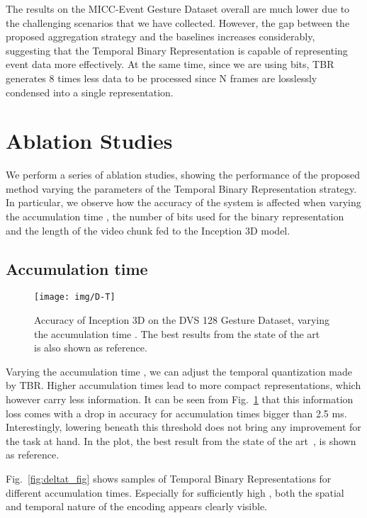 \documentclass[a4paper,conference]{IEEEtran}
\begin{document}
The results on the MICC-Event Gesture Dataset overall are much lower due to the challenging scenarios that we have collected. However, the gap between the proposed aggregation strategy and the baselines increases considerably, suggesting that the Temporal Binary Representation is capable of representing event data more effectively. At the same time, since we are using  bits, TBR generates 8 times less data to be processed since N frames are losslessly condensed into a single representation.

\section{Ablation Studies}
\label{sec:ablation}
We perform a series of ablation studies, showing the performance of the proposed method varying the parameters of the Temporal Binary Representation strategy.
In particular, we observe how the accuracy of the system is affected when varying the accumulation time , the number of bits used for the binary representation and the length of the video chunk fed to the Inception 3D model.

\subsection{Accumulation time}
\begin{figure}[!t]
	\centering
	\texttt{[image: img/D-T]}
	\caption{Accuracy of Inception 3D on the DVS 128 Gesture Dataset, varying the accumulation time . The best results from the state of the art~\cite{ghosh2019spatiotemporal} is also shown as reference.}
	\label{fig:deltat}
\end{figure}

Varying the accumulation time , we can adjust the temporal quantization made by TBR. Higher accumulation times lead to more compact representations, which however carry less information. It can be seen from Fig.~\ref{fig:deltat} that this information loss comes with a drop in accuracy for accumulation times bigger than 2.5 ms. Interestingly, lowering  beneath this threshold does not bring any improvement for the task at hand. In the plot, the best result from the state of the art~\cite{ghosh2019spatiotemporal}, is shown as reference.

Fig.~\ref{fig:deltat_fig} shows samples of Temporal Binary Representations for different accumulation times. Especially for sufficiently high , both the spatial and temporal nature of the encoding appears clearly visible.
\end{document}
